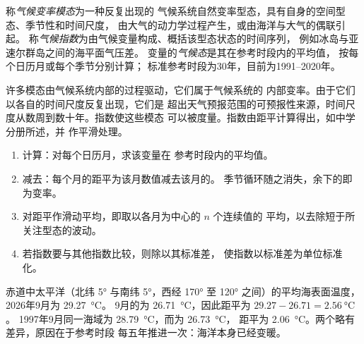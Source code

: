 \begin{definition}\label{def:b2:climate-variability:modes}
称\emph{气候变率模态}为一种反复出现的
气候系统自然变率型态，具有自身的空间型态、季节性和时间尺度，
由大气的动力学过程产生，或由海洋与大气的偶联引起。
称\emph{气候指数}为由气候变量构成、概括该型态状态的时间序列，
例如冰岛与亚速尔群岛之间的海平面气压差。
变量的\emph{气候态}是其在参考时段内的平均值，
按每个日历月或每个季节分别计算；
标准参考时段为30年，目前为1991--2020年。
\end{definition}

许多模态由气候系统内部的过程驱动，它们属于气候系统的
内部变率。由于它们以各自的时间尺度反复出现，它们是
超出天气预报范围的可预报性来源，时间尺度从数周到数十年。指数使这些模态
可以被度量。指数由距平计算得出，如中学分册所述，并
作平滑处理。

\begin{method}[从观测到指数]\label{met:b2:climate-variability:index}
\begin{enumerate}
  \item 计算：对每个日历月，求该变量在
        参考时段内的平均值。
  \item 减去：每个月的距平为该月数值减去该月的。
        季节循环随之消失，余下的即为变率。
  \item 对距平作滑动平均，即取以各月为中心的 $n$ 个连续值的
        平均，以去除短于所关注型态的波动。
  \item 若指数要与其他指数比较，则除以其标准差，
        使指数以标准差为单位标准化。
\end{enumerate}
\end{method}

\begin{example}[距平]\label{ex:b2:climate-variability:anomaly}
赤道中太平洋（北纬 \ang{5} 与南纬 \ang{5}，西经 \ang{170} 至
\ang{120} 之间）的平均海表面温度，2026年9月为 \qty{29.27}{\celsius}。
9月的为 \qty{26.71}{\celsius}，因此距平为 $29.27 - 26.71 = \qty{2.56}{\celsius}$。
1997年9月同一海域为 \qty{28.79}{\celsius}，而为 \qty{26.73}{\celsius}，
距平为 \qty{2.06}{\celsius}。两个略有差异，原因在于参考时段
每五年推进一次：海洋本身已经变暖。
\end{example}


